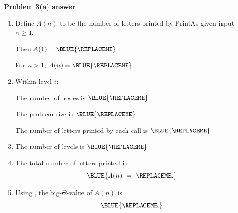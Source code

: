 \textbf{Problem 3(a) answer} 

\begin{enumerate}[label=(\roman*)]
\item[(i)] Define $A(n)$ to be the number of letters printed by {\sc PrintAs} given input $n\ge 1$.

  Then $A(1) = \BLUE{
    \REPLACEME
  }$

  For $n>1$, $A(n) = \BLUE{
    \REPLACEME 
  }$
  
\item[(ii)] Within level $i$:

  The number of nodes is $\BLUE{
    \REPLACEME 
  }$
  
  The problem size is $\BLUE{
    \REPLACEME 
  }$

  The number of letters printed by each call is $\BLUE{
    \REPLACEME 
  }$

\item[(iii)] The number of levels is $\BLUE{
    \REPLACEME 
  }$
  
\item[(iv)] The total number of letters printed is
  \[ \BLUE{A(n) ~=~
      \REPLACEME 
    .}
  \]

\item[(v)] Using \BLUE{
    \REPLACEME
  }, the big-$\Theta$-value of $A(n)$ is
  \[\BLUE{
      \REPLACEME
    .}\]

\end{enumerate}


